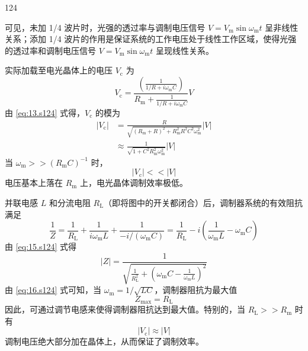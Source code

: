 \begin{solution}{124}
\begin{subsolution}
        可见，未加 1/4 波片时，光强的透过率与调制电压信号 $V = V_{\mathrm{m}} \sin \omega_{\mathrm{m}} t$ 呈非线性关系；添加 1/4 波片的作用是保证系统的工作电压处于线性工作区域，使得光强的透过率和调制电压信号 $V = V_{\mathrm{m}} \sin \omega_{\mathrm{m}} t$ 呈现线性关系。
    \end{subsolution}
    \begin{subsolution}
        实际加载至电光晶体上的电压 $V_{\mathrm{c}}$ 为
        \begin{equation}
            V_{\mathrm{c}} = \frac{\left(\frac{1}{1/R + i \omega_{\mathrm{m}} C}\right)}{R_{\mathrm{m}} + \frac{1}{1/R + i \omega_{\mathrm{m}} C}} V
            \label{eq:13.s124}
        \end{equation}
        由 \eqref{eq:13.s124} 式得，$V_{\mathrm{c}}$ 的模为
        \begin{align}
            |V_{\mathrm{c}}| & = \frac{R}{\sqrt{(R_{\mathrm{m}} + R)^{2} + R_{\mathrm{m}}^{2} R^{2} C^{2} \omega_{\mathrm{m}}^{2}}} |V| \nonumber \\
            & \approx \frac{1}{\sqrt{1 + C^{2} R_{\mathrm{m}}^{2} \omega_{\mathrm{m}}^{2}}} |V|
            \label{eq:14.s124}
        \end{align}
        当 $\omega_{\mathrm{m}} >> (R_{\mathrm{m}} C)^{-1}$ 时，
        \begin{equation}
            |V_{\mathrm{c}}| << |V|
        \end{equation}
        电压基本上落在 $R_{\mathrm{m}}$ 上，电光晶体调制效率极低。
    \end{subsolution}
    \begin{subsolution}
        并联电感 $L$ 和分流电阻 $R_{\mathrm{L}}$（即将图中的开关都闭合）后，调制器系统的有效阻抗满足
        \begin{equation}
            \frac{1}{Z} = \frac{1}{R_{\mathrm{L}}} + \frac{1}{i \omega_{\mathrm{m}} L} + \frac{1}{-i / (\omega_{\mathrm{m}} C)} = \frac{1}{R_{\mathrm{L}}} - i \left(\frac{1}{\omega_{\mathrm{m}} L} - \omega_{\mathrm{m}} C\right)
            \label{eq:15.s124}
        \end{equation}
        由 \eqref{eq:15.s124} 式得
        \begin{equation}
            |Z| = \frac{1}{\sqrt{\frac{1}{R_{\mathrm{L}}^{2}} + \left(\omega_{\mathrm{m}} C - \frac{1}{\omega_{\mathrm{m}} L}\right)^{2}}}
            \label{eq:16.s124}
        \end{equation}
        由 \eqref{eq:16.s124} 式可知，当 $\omega_{\mathrm{m}} = 1/\sqrt{LC}$，调制器阻抗为最大值
        \begin{equation}
            Z_{\max} = R_{\mathrm{L}}
            \label{eq:17.s124}
        \end{equation}
        因此，可通过调节电感来使得调制器阻抗达到最大值。特别的，当 $R_{\mathrm{L}} >> R_{\mathrm{m}}$ 时有
        \begin{equation}
            |V_{\mathrm{c}}| \approx |V|
            \label{eq:18.s124}
        \end{equation}
        调制电压绝大部分加在晶体上，从而保证了调制效率。
    \end{subsolution}
\end{solution}